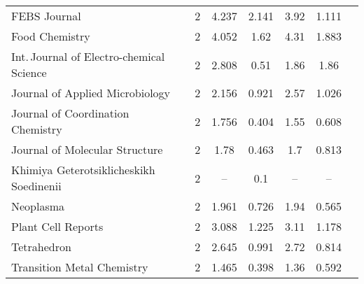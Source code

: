 {\begin{longtable}[c]{lcccccc}
  FEBS Journal                                             & 2  & 4.237         & 2.141          & 3.92 & 1.111         \\
  Food Chemistry                                           & 2  & 4.052         & 1.62           & 4.31 & 1.883         \\[1ex]
  Int.\,Journal of Electro-chemical Science                & 2  & 2.808         & 0.51           & 1.86 & 1.86          \\
  Journal of Applied Microbiology                          & 2  & 2.156         & 0.921          & 2.57 & 1.026         \\
  Journal of Coordination Chemistry                        & 2  & 1.756         & 0.404          & 1.55 & 0.608         \\
  Journal of Molecular Structure                           & 2  & 1.78          & 0.463          & 1.7  & 0.813         \\[1ex]
  Khimiya Geterotsiklicheskikh Soedinenii                  & 2  & --            & 0.1            & --   & --              \\
  Neoplasma                                                & 2  & 1.961         & 0.726          & 1.94 & 0.565         \\
  Plant Cell Reports                                       & 2  & 3.088         & 1.225          & 3.11 & 1.178         \\
  Tetrahedron                                              & 2  & 2.645         & 0.991          & 2.72 & 0.814         \\
  Transition Metal Chemistry                               & 2  & 1.465         & 0.398          & 1.36 & 0.592         \\[0.5ex]
\end{longtable}}

